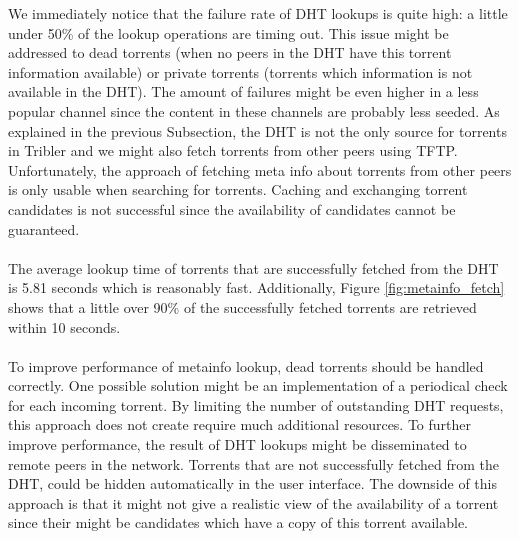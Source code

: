 We immediately notice that the failure rate of DHT lookups is quite high: a little under 50\% of the lookup operations are timing out. This issue might be addressed to dead torrents (when no peers in the DHT have this torrent information available) or private torrents (torrents which information is not available in the DHT). The amount of failures might be even higher in a less popular channel since the content in these channels are probably less seeded. As explained in the previous Subsection, the DHT is not the only source for torrents in Tribler and we might also fetch torrents from other peers using TFTP. Unfortunately, the approach of fetching meta info about torrents from other peers is only usable when searching for torrents. Caching and exchanging torrent candidates is not successful since the availability of candidates cannot be guaranteed.\\\\
The average lookup time of torrents that are successfully fetched from the DHT is 5.81 seconds which is reasonably fast. Additionally, Figure \ref{fig:metainfo_fetch} shows that a little over 90\% of the successfully fetched torrents are retrieved within 10 seconds.\\\\
To improve performance of metainfo lookup, dead torrents should be handled correctly. One possible solution might be an implementation of a periodical check for each incoming torrent. By limiting the number of outstanding DHT requests, this approach does not create require much additional resources. To further improve performance, the result of DHT lookups might be disseminated to remote peers in the network. Torrents that are not successfully fetched from the DHT, could be hidden automatically in the user interface. The downside of this approach is that it might not give a realistic view of the availability of a torrent since their might be candidates which have a copy of this torrent available.